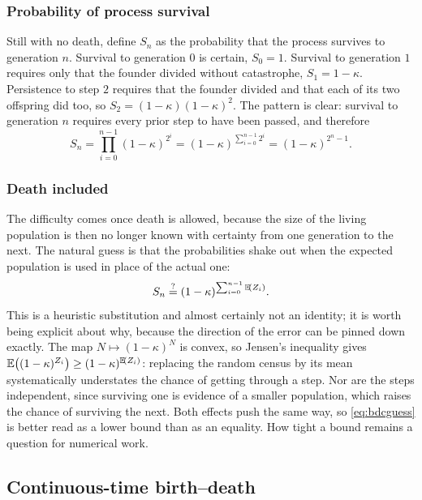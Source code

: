 \subsubsection*{Probability of process survival}

Still with no death, define $S_n$ as the probability that the process survives to
generation $n$. Survival to generation $0$ is certain, $S_0=1$. Survival to
generation $1$ requires only that the founder divided without catastrophe,
$S_1=1-\kappa$. Persistence to step $2$ requires that the founder divided and that
each of its two offspring did too, so $S_2 = (1-\kappa)(1-\kappa)^2$. The pattern
is clear: survival to generation $n$ requires every prior step to have been passed,
and therefore
\begin{equation}
\label{eq:bdcS}
S_n = \prod_{i=0}^{n-1}(1-\kappa)^{2^i}
= (1-\kappa)^{\sum_{i=0}^{n-1}2^i}
= (1-\kappa)^{2^n-1} .
\end{equation}

\subsubsection*{Death included}

The difficulty comes once death is allowed, because the size of the living
population is then no longer known with certainty from one generation to the next.
The natural guess is that the probabilities shake out when the expected population
is used in place of the actual one:
\begin{equation}
\label{eq:bdcguess}
S_n \overset{?}{=} (1-\kappa)^{\sum_{i=0}^{n-1}\mathbb{E}\!\left(Z_i\right)} .
\end{equation}
This is a heuristic substitution and almost certainly not an identity; it is worth
being explicit about why, because the direction of the error can be pinned down
exactly. The map $N\mapsto(1-\kappa)^N$ is convex, so Jensen's inequality gives
$\mathbb{E}\!\left((1-\kappa)^{Z_i}\right)\ge(1-\kappa)^{\mathbb{E}\!\left(Z_i\right)}$: replacing the random census by its
mean systematically understates the chance of getting through a step. Nor are the
steps independent, since surviving one is evidence of a smaller population, which
raises the chance of surviving the next. Both effects push the same way, so
\cref{eq:bdcguess} is better read as a lower bound than as an equality. How tight a
bound remains a question for numerical work.

\subsection{Continuous-time birth--death}
\label{sec:cts}

